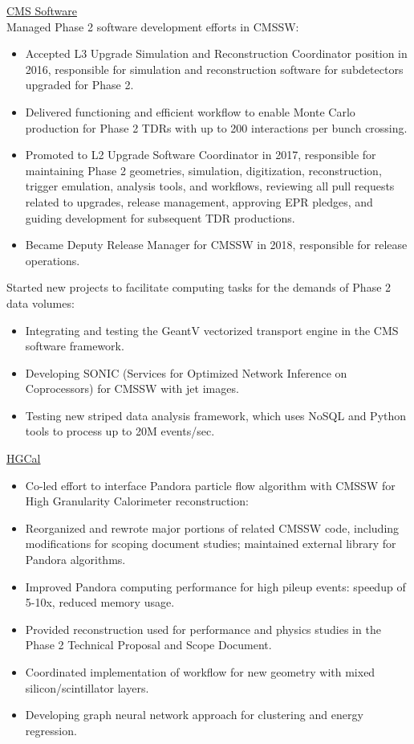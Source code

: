 \underline{CMS Software}\\
Managed Phase 2 software development efforts in CMSSW:
\begin{itemize}[leftmargin=12pt]
\item Accepted L3 Upgrade Simulation and Reconstruction Coordinator position in 2016, responsible for simulation and reconstruction software for subdetectors upgraded for Phase 2.
\item Delivered functioning and efficient workflow to enable Monte Carlo production for Phase 2 TDRs with up to 200 interactions per bunch crossing.
\item Promoted to L2 Upgrade Software Coordinator in 2017, responsible for maintaining Phase 2 geometries, simulation, digitization, reconstruction, trigger emulation, analysis tools, and workflows, reviewing all pull requests related to upgrades, release management, approving EPR pledges, and guiding development for subsequent TDR productions.
\item Became Deputy Release Manager for CMSSW in 2018, responsible for release operations.
\end{itemize}
Started new projects to facilitate computing tasks for the demands of Phase 2 data volumes:
\begin{itemize}[leftmargin=12pt]
\item Integrating and testing the GeantV vectorized transport engine in the CMS software framework.
\item Developing SONIC (Services for Optimized Network Inference on Coprocessors) for CMSSW with jet images.
\item Testing new striped data analysis framework, which uses NoSQL and Python tools to process up to 20M events/sec.
\end{itemize}
\underline{HGCal}
\begin{itemize}[leftmargin=12pt]
\item Co-led effort to interface Pandora particle flow algorithm with CMSSW for High Granularity Calorimeter reconstruction:
\item Reorganized and rewrote major portions of related CMSSW code, including modifications for scoping document studies; maintained external library for Pandora algorithms.
\item Improved Pandora computing performance for high pileup events: speedup of 5-10x, reduced memory usage.
\item Provided reconstruction used for performance and physics studies in the Phase 2 Technical Proposal and Scope Document.
\item Coordinated implementation of workflow for new geometry with mixed silicon/scintillator layers.
\item Developing graph neural network approach for clustering and energy regression.
\end{itemize}
